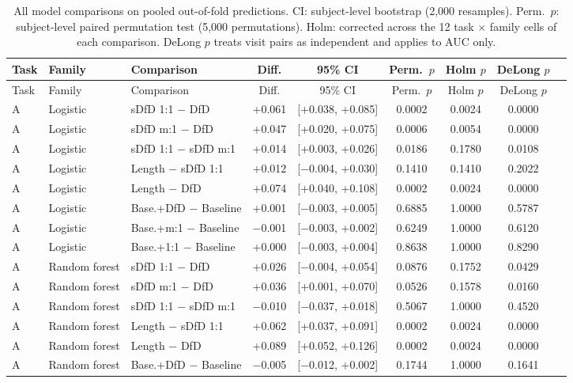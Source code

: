 \begin{longtable}{lllcccccc}
\caption{All model comparisons on pooled out-of-fold predictions. CI: subject-level bootstrap (2{,}000 resamples). Perm.~$p$: subject-level paired permutation test (5{,}000 permutations). Holm: corrected across the 12 task $\times$ family cells of each comparison. DeLong $p$ treats visit pairs as independent and applies to AUC only.}\label{tab:supp_tests}\\
\toprule
Task & Family & Comparison & Diff. & 95\% CI & Perm.~$p$ & Holm $p$ & DeLong $p$ \\
\midrule
\endfirsthead
\toprule
Task & Family & Comparison & Diff. & 95\% CI & Perm.~$p$ & Holm $p$ & DeLong $p$ \\
\midrule
\endhead
A & Logistic & sDfD 1:1 $-$ DfD & +0.061 & [+0.038, +0.085] & 0.0002 & 0.0024 & 0.0000 \\
A & Logistic & sDfD m:1 $-$ DfD & +0.047 & [+0.020, +0.075] & 0.0006 & 0.0054 & 0.0000 \\
A & Logistic & sDfD 1:1 $-$ sDfD m:1 & +0.014 & [+0.003, +0.026] & 0.0186 & 0.1780 & 0.0108 \\
A & Logistic & Length $-$ sDfD 1:1 & +0.012 & [$-$0.004, +0.030] & 0.1410 & 0.1410 & 0.2022 \\
A & Logistic & Length $-$ DfD & +0.074 & [+0.040, +0.108] & 0.0002 & 0.0024 & 0.0000 \\
A & Logistic & Base.+DfD $-$ Baseline & +0.001 & [$-$0.003, +0.005] & 0.6885 & 1.0000 & 0.5787 \\
A & Logistic & Base.+m:1 $-$ Baseline & $-$0.001 & [$-$0.003, +0.002] & 0.6249 & 1.0000 & 0.6120 \\
A & Logistic & Base.+1:1 $-$ Baseline & +0.000 & [$-$0.003, +0.004] & 0.8638 & 1.0000 & 0.8290 \\
A & Random forest & sDfD 1:1 $-$ DfD & +0.026 & [$-$0.004, +0.054] & 0.0876 & 0.1752 & 0.0429 \\
A & Random forest & sDfD m:1 $-$ DfD & +0.036 & [+0.001, +0.070] & 0.0526 & 0.1578 & 0.0160 \\
A & Random forest & sDfD 1:1 $-$ sDfD m:1 & $-$0.010 & [$-$0.037, +0.018] & 0.5067 & 1.0000 & 0.4520 \\
A & Random forest & Length $-$ sDfD 1:1 & +0.062 & [+0.037, +0.091] & 0.0002 & 0.0024 & 0.0000 \\
A & Random forest & Length $-$ DfD & +0.089 & [+0.052, +0.126] & 0.0002 & 0.0024 & 0.0000 \\
A & Random forest & Base.+DfD $-$ Baseline & $-$0.005 & [$-$0.012, +0.002] & 0.1744 & 1.0000 & 0.1641 \\

\end{longtable}
